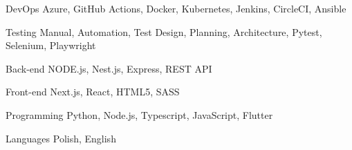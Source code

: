 

\begin{cvskills}

  \cvskill
    {DevOps} %
    {Azure, GitHub Actions, Docker, Kubernetes, Jenkins, CircleCI, Ansible} %

  \cvskill
    {Testing} %
    {Manual, Automation, Test Design, Planning, Architecture, Pytest, Selenium, Playwright} %

  \cvskill
    {Back-end} %
    {NODE.js, Nest.js, Express, REST API} %

  \cvskill
    {Front-end} %
    {Next.js, React, HTML5, SASS} %

  \cvskill
    {Programming} %
    {Python, Node.js, Typescript, JavaScript, Flutter} %


  \cvskill
    {Languages} %
    {Polish, English} %

\end{cvskills}
